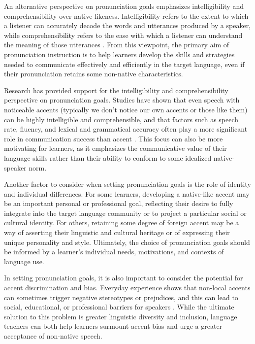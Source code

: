 An alternative perspective on pronunciation goals emphasizes intelligibility and comprehensibility over native-likeness. Intelligibility refers to the extent to which a listener can accurately decode the words and utterances produced by a speaker, while comprehensibility refers to the ease with which a listener can understand the meaning of those utterances \citep{DerwingMunro2015}. From this viewpoint, the primary aim of pronunciation instruction is to help learners develop the skills and strategies needed to communicate effectively and efficiently in the target language, even if their pronunciation retains some non-native characteristics.

Research has provided support for the intelligibility and comprehensibility perspective on pronunciation goals. Studies have shown that even speech with noticeable accents (typically we don't notice our own accents or those like them) can be highly intelligible and comprehensible, and that factors such as speech rate, fluency, and lexical and grammatical accuracy often play a more significant role in communication success than accent \citep{MunroDerwing1995}. This focus can also be more motivating for learners, as it emphasizes the communicative value of their language skills rather than their ability to conform to some idealized native-speaker norm.

Another factor to consider when setting pronunciation goals is the role of identity and individual differences. For some learners, developing a native-like accent may be an important personal or professional goal, reflecting their desire to fully integrate into the target language community or to project a particular social or cultural identity. For others, retaining some degree of foreign accent may be a way of asserting their linguistic and cultural heritage or of expressing their unique personality and style. Ultimately, the choice of pronunciation goals should be informed by a learner's individual needs, motivations, and contexts of language use.

In setting pronunciation goals, it is also important to consider the potential for accent discrimination and bias. Everyday experience shows that non-local accents can sometimes trigger negative stereotypes or prejudices, and this can lead to social, educational, or professional barriers for speakers \citep{LippiGreen2012accent}. While the ultimate solution to this problem is greater linguistic diversity and inclusion, language teachers can both help learners surmount accent bias and urge a greater acceptance of non-native speech.


